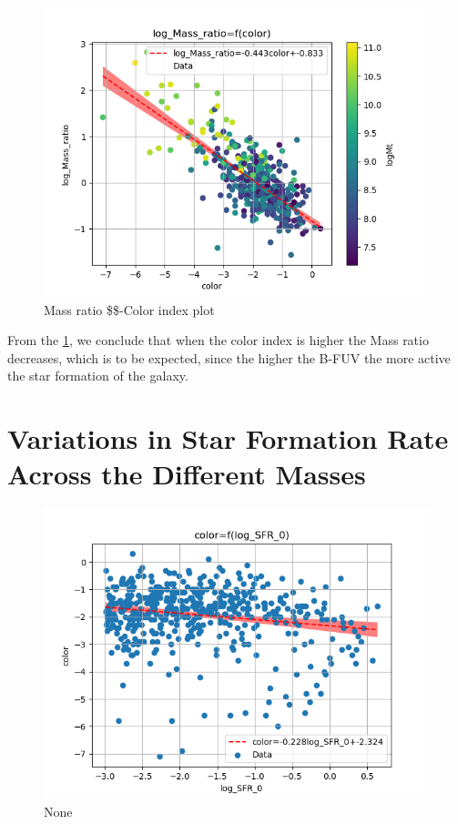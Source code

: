 \documentclass[a4paper,twocolumn]{article}
\begin{document}
\begin{figure}[!htpb]
\centering
\includegraphics[width=.9\linewidth]{./figs/color-log_Mass_ratio-color_logMt.png}
\caption{\label{fig:col_Mr}Mass ratio \$\$-Color index plot}
\end{figure}

From the \ref{fig:col_Mr}, we conclude that when the color index is higher the Mass ratio decreases, which is to be expected, since the higher the B-FUV the more active the star formation of the galaxy.



\section{Variations in Star Formation Rate Across the Different Masses}
\label{sec:orgb7febe7}


\begin{figure}[!htpb]
\centering
\includegraphics[width=.9\linewidth]{./figs/log_SFR_0-color.png}
\caption{\label{fig:None}None}
\end{figure}
\end{document}
